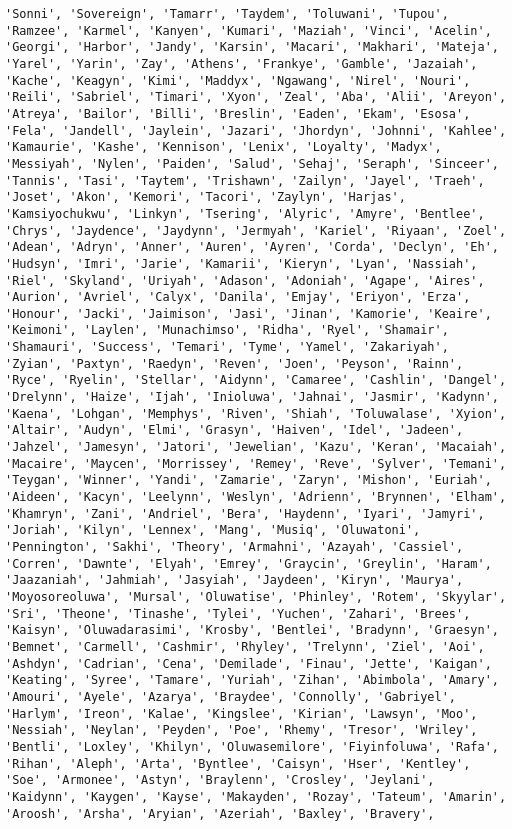 \documentclass[11pt]{article}
\begin{document}
\begin{Verbatim}[commandchars=\\\{\}]
'Sonni', 'Sovereign', 'Tamarr', 'Taydem', 'Toluwani', 'Tupou', 'Ramzee', 'Karmel', 'Kanyen', 'Kumari', 'Maziah', 'Vinci', 'Acelin', 'Georgi', 'Harbor', 'Jandy', 'Karsin', 'Macari', 'Makhari', 'Mateja', 'Yarel', 'Yarin', 'Zay', 'Athens', 'Frankye', 'Gamble', 'Jazaiah', 'Kache', 'Keagyn', 'Kimi', 'Maddyx', 'Ngawang', 'Nirel', 'Nouri', 'Reili', 'Sabriel', 'Timari', 'Xyon', 'Zeal', 'Aba', 'Alii', 'Areyon', 'Atreya', 'Bailor', 'Billi', 'Breslin', 'Eaden', 'Ekam', 'Esosa', 'Fela', 'Jandell', 'Jaylein', 'Jazari', 'Jhordyn', 'Johnni', 'Kahlee', 'Kamaurie', 'Kashe', 'Kennison', 'Lenix', 'Loyalty', 'Madyx', 'Messiyah', 'Nylen', 'Paiden', 'Salud', 'Sehaj', 'Seraph', 'Sinceer', 'Tannis', 'Tasi', 'Taytem', 'Trishawn', 'Zailyn', 'Jayel', 'Traeh', 'Joset', 'Akon', 'Kemori', 'Tacori', 'Zaylyn', 'Harjas', 'Kamsiyochukwu', 'Linkyn', 'Tsering', 'Alyric', 'Amyre', 'Bentlee', 'Chrys', 'Jaydence', 'Jaydynn', 'Jermyah', 'Kariel', 'Riyaan', 'Zoel', 'Adean', 'Adryn', 'Anner', 'Auren', 'Ayren', 'Corda', 'Declyn', 'Eh', 'Hudsyn', 'Imri', 'Jarie', 'Kamarii', 'Kieryn', 'Lyan', 'Nassiah', 'Riel', 'Skyland', 'Uriyah', 'Adason', 'Adoniah', 'Agape', 'Aires', 'Aurion', 'Avriel', 'Calyx', 'Danila', 'Emjay', 'Eriyon', 'Erza', 'Honour', 'Jacki', 'Jaimison', 'Jasi', 'Jinan', 'Kamorie', 'Keaire', 'Keimoni', 'Laylen', 'Munachimso', 'Ridha', 'Ryel', 'Shamair', 'Shamauri', 'Success', 'Temari', 'Tyme', 'Yamel', 'Zakariyah', 'Zyian', 'Paxtyn', 'Raedyn', 'Reven', 'Joen', 'Peyson', 'Rainn', 'Ryce', 'Ryelin', 'Stellar', 'Aidynn', 'Camaree', 'Cashlin', 'Dangel', 'Drelynn', 'Haize', 'Ijah', 'Inioluwa', 'Jahnai', 'Jasmir', 'Kadynn', 'Kaena', 'Lohgan', 'Memphys', 'Riven', 'Shiah', 'Toluwalase', 'Xyion', 'Altair', 'Audyn', 'Elmi', 'Grasyn', 'Haiven', 'Idel', 'Jadeen', 'Jahzel', 'Jamesyn', 'Jatori', 'Jewelian', 'Kazu', 'Keran', 'Macaiah', 'Macaire', 'Maycen', 'Morrissey', 'Remey', 'Reve', 'Sylver', 'Temani', 'Teygan', 'Winner', 'Yandi', 'Zamarie', 'Zaryn', 'Mishon', 'Euriah', 'Aideen', 'Kacyn', 'Leelynn', 'Weslyn', 'Adrienn', 'Brynnen', 'Elham', 'Khamryn', 'Zani', 'Andriel', 'Bera', 'Haydenn', 'Iyari', 'Jamyri', 'Joriah', 'Kilyn', 'Lennex', 'Mang', 'Musiq', 'Oluwatoni', 'Pennington', 'Sakhi', 'Theory', 'Armahni', 'Azayah', 'Cassiel', 'Corren', 'Dawnte', 'Elyah', 'Emrey', 'Graycin', 'Greylin', 'Haram', 'Jaazaniah', 'Jahmiah', 'Jasyiah', 'Jaydeen', 'Kiryn', 'Maurya', 'Moyosoreoluwa', 'Mursal', 'Oluwatise', 'Phinley', 'Rotem', 'Skyylar', 'Sri', 'Theone', 'Tinashe', 'Tylei', 'Yuchen', 'Zahari', 'Brees', 'Kaisyn', 'Oluwadarasimi', 'Krosby', 'Bentlei', 'Bradynn', 'Graesyn', 'Bemnet', 'Carmell', 'Cashmir', 'Rhyley', 'Trelynn', 'Ziel', 'Aoi', 'Ashdyn', 'Cadrian', 'Cena', 'Demilade', 'Finau', 'Jette', 'Kaigan', 'Keating', 'Syree', 'Tamare', 'Yuriah', 'Zihan', 'Abimbola', 'Amary', 'Amouri', 'Ayele', 'Azarya', 'Braydee', 'Connolly', 'Gabriyel', 'Harlym', 'Ireon', 'Kalae', 'Kingslee', 'Kirian', 'Lawsyn', 'Moo', 'Nessiah', 'Neylan', 'Peyden', 'Poe', 'Rhemy', 'Tresor', 'Wriley', 'Bentli', 'Loxley', 'Khilyn', 'Oluwasemilore', 'Fiyinfoluwa', 'Rafa', 'Rihan', 'Aleph', 'Arta', 'Byntlee', 'Caisyn', 'Hser', 'Kentley', 'Soe', 'Armonee', 'Astyn', 'Braylenn', 'Crosley', 'Jeylani', 'Kaidynn', 'Kaygen', 'Kayse', 'Makayden', 'Rozay', 'Tateum', 'Amarin', 'Aroosh', 'Arsha', 'Aryian', 'Azeriah', 'Baxley', 'Bravery', 
\end{Verbatim}
\end{document}
